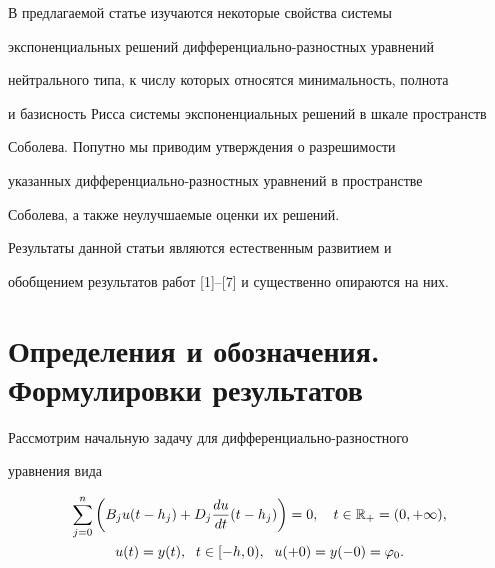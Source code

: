  




\maketitle 


\label{begin} 


 


В предлагаемой статье изучаются некоторые свойства системы 


экспоненциальных решений дифференциально-разностных уравнений 


нейтрального типа, к числу которых относятся минимальность, полнота 


и базисность Рисса системы экспоненциальных решений в шкале пространств 


Соболева. Попутно мы приводим утверждения о разрешимости 


указанных дифференциально-разностных уравнений в пространстве 


Соболева, а также неулучшаемые оценки их решений. 


 


Результаты данной статьи являются естественным развитием и 


обобщением результатов работ [1]--[7] и существенно опираются на них. 


 


\section{Определения и обозначения. Формулировки результатов} 


 


Рассмотрим начальную задачу для дифференциально-разностного 


уравнения вида 


\begin{gather} 


\sum^n_{j=0}\bigg(B_j u(t-h_j)+D_j\frac{d u}{d t}(t-h_j)\bigg)=0, 


\quad t\in\Bbb R_+=(0,+\infty),\\ 


% 


u(t)=y(t),\ \; t\in[-h,0),\ \; u(+0)=y(-0)=\varphi_0. 


\end{gather} 


